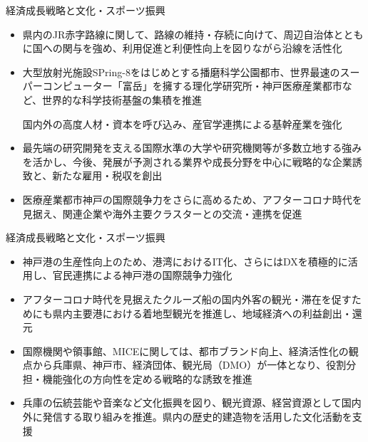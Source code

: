 \documentclass[dvipdfmx]{beamer}
\begin{document}
    \begin{frame}{経済成長戦略と文化・スポーツ振興}{}
        \begin{small}
            \begin{itemize}
                \setlength{\parsep}{.5mm}
                \setlength{\itemsep}{2mm}
                \item 県内のJR赤字路線に関して、路線の維持・存続に向けて、周辺自治体とともに国への関与を強め、利用促進と利便性向上を図りながら沿線を活性化
                \item 大型放射光施設SPring-8をはじめとする播磨科学公園都市、世界最速のスーパーコンピューター「富岳」を擁する理化学研究所・神戸医療産業都市など、世界的な科学技術基盤の集積を推進\par
                国内外の高度人材・資本を呼び込み、産官学連携による基幹産業を強化
                \item 最先端の研究開発を支える国際水準の大学や研究機関等が多数立地する強みを活かし、今後、発展が予測される業界や成長分野を中心に戦略的な企業誘致と、新たな雇用・税収を創出
                \item 医療産業都市神戸の国際競争力をさらに高めるため、アフターコロナ時代を見据え、関連企業や海外主要クラスターとの交流・連携を促進
            \end{itemize}
        \end{small}
    \end{frame}
    
    \begin{frame}{経済成長戦略と文化・スポーツ振興}{}
        \begin{small}
            \begin{itemize}
                \setlength{\parsep}{.5mm}
                \setlength{\itemsep}{2mm}
                \item 神戸港の生産性向上のため、港湾におけるIT化、さらにはDXを積極的に活用し、官民連携による神戸港の国際競争力強化
                \item アフターコロナ時代を見据えたクルーズ船の国内外客の観光・滞在を促すためにも県内主要港における着地型観光を推進し、地域経済への利益創出・還元
                \item 国際機関や領事館、MICEに関しては、都市ブランド向上、経済活性化の観点から兵庫県、神戸市、経済団体、観光局（DMO）が一体となり、役割分担・機能強化の方向性を定める戦略的な誘致を推進
                \item 兵庫の伝統芸能や音楽など文化振興を図り、観光資源、経営資源として国内外に発信する取り組みを推進。県内の歴史的建造物を活用した文化活動を支援
            \end{itemize}
        \end{small}
    \end{frame}
    
\end{document}

